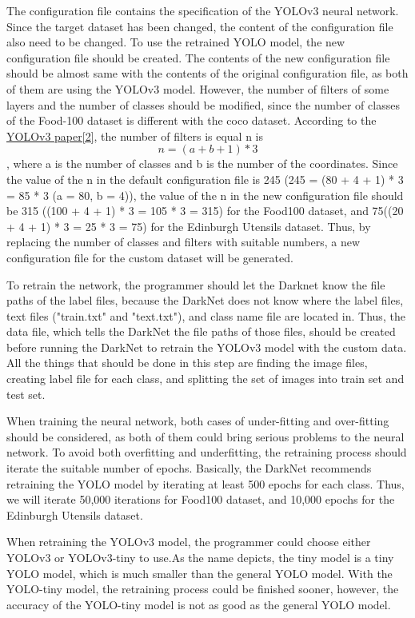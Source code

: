\documentclass{article}
\begin{document}
The configuration file contains the specification of the YOLOv3 neural network. Since the target dataset has been changed, the content of the configuration file also need to be changed. To use the retrained YOLO model, the new configuration file should be created. The contents of the new configuration file should be almost same with the contents of the original configuration file, as both of them are using the YOLOv3 model. However, the number of filters of some layers and the number of classes should be modified, since the number of classes of the Food-100 dataset is different with the coco dataset. According to the \hyperlink{ref2}{YOLOv3 paper[2]}, the number of filters is equal n is $$n = (a + b + 1) * 3$$, where a is the number of classes and b is the number of the coordinates. Since the value of the n in the default configuration file is 245 (245 = (80 + 4 + 1) * 3 = 85 * 3  (a = 80, b = 4)), the value of the n in the new configuration file should be 315 ((100 + 4 + 1) * 3 = 105 * 3 = 315) for the Food100 dataset, and 75((20 + 4 + 1) * 3 = 25 * 3 = 75) for the Edinburgh Utensils dataset. Thus, by replacing the number of classes and filters with suitable numbers, a new configuration file for the custom dataset will be generated.

To retrain the network, the programmer should let the Darknet know the file paths of the label files, because the DarkNet does not know where the label files, text files ("train.txt" and "text.txt"), and class name file are located in. Thus, the data file, which tells the DarkNet the file paths of those files, should be created before running the DarkNet to retrain the YOLOv3 model with the custom data. All the things that should be done in this step are finding the image files, creating label file for each class, and splitting the set of images into train set and test set.

When training the neural network, both cases of under-fitting and over-fitting should be considered, as both of them could bring serious problems to the neural network. To avoid both overfitting and underfitting, the retraining process should iterate the suitable number of epochs. Basically, the DarkNet recommends retraining the YOLO model by iterating at least 500 epochs for each class. Thus, we will iterate 50,000 iterations for Food100 dataset, and 10,000 epochs for the Edinburgh Utensils dataset.

When retraining the YOLOv3 model, the programmer could choose either YOLOv3 or YOLOv3-tiny to use.As the name depicts, the tiny model is a tiny YOLO model, which is much smaller than the general YOLO model. With the YOLO-tiny model, the retraining process could be finished sooner, however, the accuracy of the YOLO-tiny model is not as good as the general YOLO model.
\end{document}
